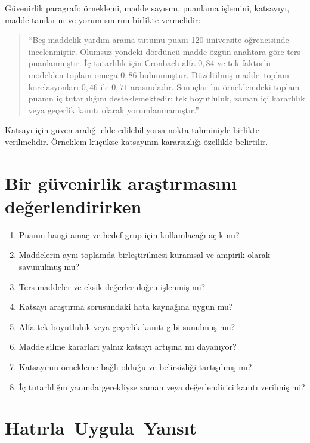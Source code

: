 Güvenirlik paragrafı; örneklemi, madde sayısını, puanlama işlemini, katsayıyı,
madde tanılarını ve yorum sınırını birlikte vermelidir:

\begin{quote}
``Beş maddelik yardım arama tutumu puanı 120 üniversite öğrencisinde
incelenmiştir. Olumsuz yöndeki dördüncü madde özgün anahtara göre ters
puanlanmıştır. İç tutarlılık için Cronbach alfa $0{,}84$ ve tek faktörlü
modelden toplam omega $0{,}86$ bulunmuştur. Düzeltilmiş madde--toplam
korelasyonları $0{,}46$ ile $0{,}71$ arasındadır. Sonuçlar bu örneklemdeki
toplam puanın iç tutarlılığını desteklemektedir; tek boyutluluk, zaman içi
kararlılık veya geçerlik kanıtı olarak yorumlanmamıştır.''
\end{quote}

Katsayı için güven aralığı elde edilebiliyorsa nokta tahminiyle birlikte
verilmelidir. Örneklem küçükse katsayının kararsızlığı özellikle belirtilir.

\section{Bir güvenirlik araştırmasını değerlendirirken}

\begin{enumerate}
  \item Puanın hangi amaç ve hedef grup için kullanılacağı açık mı?
  \item Maddelerin aynı toplamda birleştirilmesi kuramsal ve ampirik olarak savunulmuş mu?
  \item Ters maddeler ve eksik değerler doğru işlenmiş mi?
  \item Katsayı araştırma sorusundaki hata kaynağına uygun mu?
  \item Alfa tek boyutluluk veya geçerlik kanıtı gibi sunulmuş mu?
  \item Madde silme kararları yalnız katsayı artışına mı dayanıyor?
  \item Katsayının örnekleme bağlı olduğu ve belirsizliği tartışılmış mı?
  \item İç tutarlılığın yanında gerekliyse zaman veya değerlendirici kanıtı verilmiş mi?
\end{enumerate}




\section*{Hatırla--Uygula--Yansıt}

